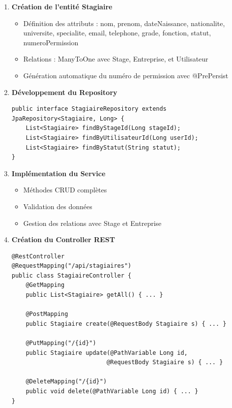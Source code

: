 \documentclass[12pt,a4paper]{report}
\begin{document}
\begin{enumerate}[leftmargin=1cm]
    \item \textbf{Création de l'entité Stagiaire}
    \begin{itemize}
        \item Définition des attributs : nom, prenom, dateNaissance, nationalite, universite, specialite, email, telephone, grade, fonction, statut, numeroPermission
        \item Relations : ManyToOne avec Stage, Entreprise, et Utilisateur
        \item Génération automatique du numéro de permission avec @PrePersist
    \end{itemize}
    
    \item \textbf{Développement du Repository}
    \begin{lstlisting}[caption={StagiaireRepository.java}]
public interface StagiaireRepository extends JpaRepository<Stagiaire, Long> {
    List<Stagiaire> findByStageId(Long stageId);
    List<Stagiaire> findByUtilisateurId(Long userId);
    List<Stagiaire> findByStatut(String statut);
}
\end{lstlisting}
    
    \item \textbf{Implémentation du Service}
    \begin{itemize}
        \item Méthodes CRUD complètes
        \item Validation des données
        \item Gestion des relations avec Stage et Entreprise
    \end{itemize}
    
    \item \textbf{Création du Controller REST}
    \begin{lstlisting}[caption={StagiaireController.java}]
@RestController
@RequestMapping("/api/stagiaires")
public class StagiaireController {
    @GetMapping
    public List<Stagiaire> getAll() { ... }
    
    @PostMapping
    public Stagiaire create(@RequestBody Stagiaire s) { ... }
    
    @PutMapping("/{id}")
    public Stagiaire update(@PathVariable Long id, 
                           @RequestBody Stagiaire s) { ... }
    
    @DeleteMapping("/{id}")
    public void delete(@PathVariable Long id) { ... }
}
\end{lstlisting}
\end{enumerate}
\end{document}
